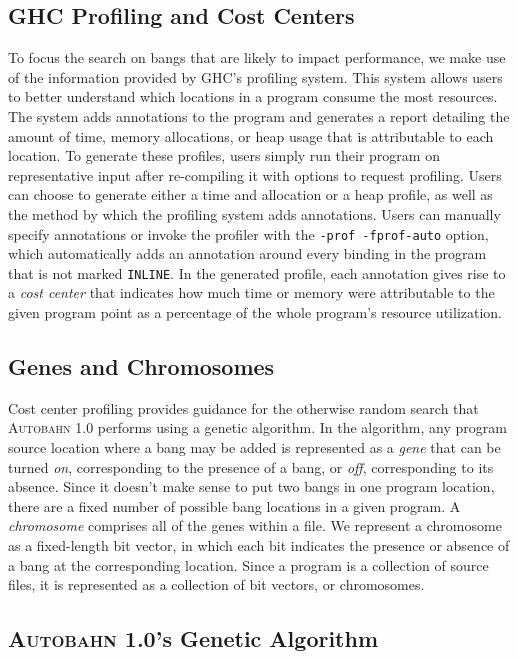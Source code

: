 \documentclass[format=sigplan, review=true, 9pt]{acmart}
\newcommand{\Ao}[0]{\textsc{Autobahn 1.0}}
\begin{document}
\subsection{GHC Profiling and Cost Centers}
To focus the search on bangs that are likely to impact performance, we
make use of the information provided by GHC's profiling system.
This system allows users to better understand which locations
in a program consume the most resources.  The system adds annotations
to the program and generates a report detailing the amount of time,
memory allocations, or heap usage that is attributable to each location.
To generate these profiles, users simply run their program on
representative input after re-compiling it with options to request profiling.
Users can choose to generate either a time and allocation or a heap
profile, as well as the method by which the profiling system adds
annotations. Users can manually specify
annotations or invoke the profiler with  the \texttt{-prof -fprof-auto} option, which
automatically adds an annotation around every binding in the program
that is not marked \texttt{INLINE}.  In the generated profile, each
annotation gives rise to a \textit{cost center} that indicates how
much time or memory were attributable to the given program point as a
percentage of the whole program's resource utilization.  


\subsection{Genes and Chromosomes}

Cost center profiling provides guidance for the otherwise random
search that \Ao{} performs using a genetic algorithm. In the
algorithm, any program source location where a bang may be added is
represented as a \textit{gene} that can be turned \textit{on},
corresponding to the presence of a bang, or \textit{off},
corresponding to its absence.  Since it doesn't make sense to put two
bangs in one program location, there are a fixed number of possible
bang locations in a given program. A \textit{chromosome} comprises all
of the genes within a file. We represent a chromosome as a
fixed-length bit vector, in which each bit indicates the presence or
absence of a bang at the corresponding location. Since a program is a
collection of source files, it is represented as a collection of bit
vectors, or chromosomes.

\subsection{\Ao{}'s Genetic Algorithm}
\end{document}
